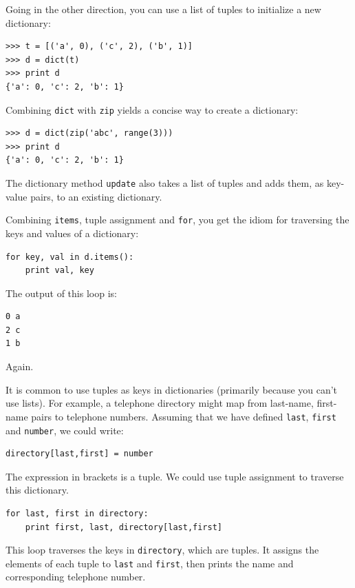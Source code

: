\documentclass[10pt]{book}
\begin{document}
Going in the other direction, you can use a list of tuples to
initialize a new dictionary: 

\begin{verbatim}
>>> t = [('a', 0), ('c', 2), ('b', 1)]
>>> d = dict(t)
>>> print d
{'a': 0, 'c': 2, 'b': 1}
\end{verbatim}

Combining {\tt dict} with {\tt zip} yields a concise way
to create a dictionary:

\begin{verbatim}
>>> d = dict(zip('abc', range(3)))
>>> print d
{'a': 0, 'c': 2, 'b': 1}
\end{verbatim}
%
The dictionary method {\tt update} also takes a list of tuples
and adds them, as key-value pairs, to an existing dictionary.

Combining {\tt items}, tuple assignment and {\tt for}, you
get the idiom for traversing the keys and values of a dictionary:

\begin{verbatim}
for key, val in d.items():
    print val, key
\end{verbatim}
%
The output of this loop is:

\begin{verbatim}
0 a
2 c
1 b
\end{verbatim}
%
Again.

It is common to use tuples as keys in dictionaries (primarily because
you can't use lists).  For example, a telephone directory might map
from last-name, first-name pairs to telephone numbers.  Assuming
that we have defined {\tt last}, {\tt first} and {\tt number}, we
could write:

\begin{verbatim}
directory[last,first] = number
\end{verbatim}
%
The expression in brackets is a tuple.  We could use tuple
assignment to traverse this dictionary.

\begin{verbatim}
for last, first in directory:
    print first, last, directory[last,first]
\end{verbatim}
%
This loop traverses the keys in {\tt directory}, which are tuples.  It
assigns the elements of each tuple to {\tt last} and {\tt first}, then
prints the name and corresponding telephone number.
\end{document}
